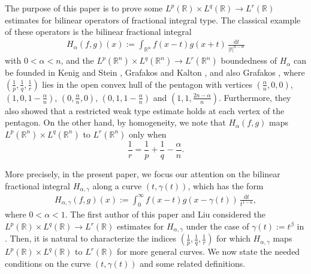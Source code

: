 \documentclass[11pt, twoside, leqno]{article}
\theoremstyle{definition}
\numberwithin{equation}{section}
\begin{document}
The purpose of this paper is to prove some $L^p(\mathbb{R})\times L^q(\mathbb{R}) \rightarrow L^r(\mathbb{R})$ estimates for bilinear operators of fractional integral type. The classical example of these operators is the bilinear fractional integral
\begin{align}\label{eq:1.00}
 H_{\alpha}(f,g)(x):=\int_{\mathbb{R}^n}f(x-t)g(x+t)\,\frac{\textrm{d}t}{|t|^{n-\alpha}}
 \end{align}
with $0<\alpha<n$, and the $L^p(\mathbb{R}^n)\times L^q(\mathbb{R}^n) \rightarrow L^r(\mathbb{R}^n)$ boundedness of $H_{\alpha}$ can be founded in Kenig and Stein \cite{KStein}, Grafakos and Kalton \cite{Grafk}, and also Grafakos \cite{Graf92}, where $(\frac{1}{p},\frac{1}{q},\frac{1}{r})$ lies in the open convex hull of the pentagon with vertices $(\frac{\alpha}{n}, 0, 0)$, $(1, 0, 1-\frac{\alpha}{n})$, $(0, \frac{\alpha}{n}, 0)$, $(0, 1, 1-\frac{\alpha}{n})$ and $(1, 1, \frac{2n-\alpha}{n})$. Furthermore, they also showed that a restricted weak type estimate holds at each vertex of the pentagon. On the other hand, by homogeneity, we note that $H_{\alpha}(f,g)$ maps $L^p(\mathbb{R}^n)\times L^q(\mathbb{R}^n)$ to $ L^r(\mathbb{R}^n)$ only when $$\frac{1}{r}=\frac{1}{p}+\frac{1}{q}-\frac{\alpha}{n}.$$

More precisely, in the present paper, we focus our attention on the bilinear fractional integral $H_{\alpha,\gamma}$ along a curve $(t,\gamma(t))$, which has the form
\begin{align}\label{eq:1.0}
 H_{\alpha,\gamma}(f,g)(x):=\int_{0}^{\infty}f(x-t)g(x-\gamma(t))\,\frac{\textrm{d}t}{t^{1-\alpha}},
 \end{align}
where $0<\alpha<1$. The first author of this paper and Liu considered the $L^p(\mathbb{R})\times L^q(\mathbb{R}) \rightarrow L^r(\mathbb{R})$ estimates for $H_{\alpha,\gamma}$ under the case of $\gamma(t):=t^\beta$ in \cite{LLiu}. Then, it is natural to characterize the indices $(\frac{1}{p}, \frac{1}{q}, \frac{1}{r})$ for which $H_{\alpha,\gamma}$ maps $L^p(\mathbb{R})\times L^q(\mathbb{R})$ to $L^r(\mathbb{R})$ for more general curves. We now state the needed conditions on the curve $(t,\gamma(t))$ and some related definitions.
\end{document}
